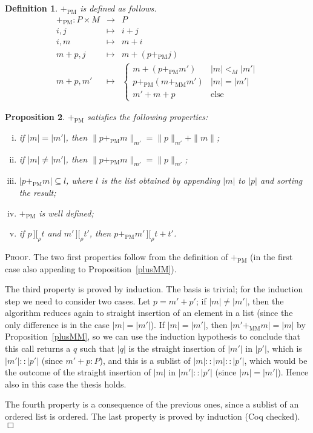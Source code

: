 \documentclass{article}
\newtheorem{definition}{Definition}[section]
\newtheorem{proposition}[definition]{Proposition}
\newenvironment{proof}{\smallskip\textsc{Proof.}}{\hspace*{\fill}$\Box$}
\newcommand{\intII}{\,]\![}
\newcommand{\intrel}{\mathbin{\intII_{\rho}}}
\newcommand{\coeff}[2]{\ensuremath{\|#2\|_{#1}}}
\newcommand{\plusMM}{\ensuremath{+_{\mathrm{MM}}}}
\newcommand{\plusPM}{\ensuremath{+_{\mathrm{PM}}}}
\begin{document}
\begin{definition}\label{defn:plusPM} {\plusPM} is defined as follows.
\begin{eqnarray*}
\plusPM : P\times M & \to & P \\
 i, j & \mapsto & i+j \\
 i, m & \mapsto & m+i \\
 m+p, j & \mapsto & m+(p\plusPM j) \\
 m+p, m' & \mapsto &
\left\{\begin{array}{ll} m+(p\plusPM m') & |m|<_M|m'| \\
 p\plusPM(m\plusMM m') & |m|=|m'| \\
 m'+m+p & \mbox{else}\end{array}\right.
\end{eqnarray*}
\end{definition}

\begin{proposition}\label{plusPM}
{\plusPM} satisfies the following properties:
\begin{enumerate}[(i)]
\item if $|m|=|m'|$, then $\coeff{m'}{p\plusPM m}=\coeff{m'}p+\|m\|$;
\item if $|m|\neq|m'|$, then $\coeff{m'}{p\plusPM m}=\coeff{m'}p$;
\item $|p\plusPM m|\subseteq l$, where $l$ is the list obtained by appending
$|m|$ to $|p|$ and sorting the result;
\item {\plusPM} is well defined;
\item if $p\intrel t$ and $m'\intrel t'$, then $p\plusPM m'\intrel t+t'$.
\end{enumerate}
\end{proposition}
\begin{proof}
The two first properties follow from the definition of {\plusPM} (in the
first case also appealing to Proposition~\ref{plusMM}).

The third property is proved by induction.  The basis is trivial; for
the induction step we need to consider two cases.  Let $p=m'+p'$; if
$|m|\neq|m'|$, then the algorithm reduces again to straight insertion
of an element in a list (since the only difference is in the case
$|m|=|m'|$).  If $|m|=|m'|$, then $|m'\plusMM m|=|m|$ by
Proposition~\ref{plusMM}, so we can use the induction hypothesis to
conclude that this call returns a $q$ such that $|q|$ is the straight
insertion of $|m'|$ in $|p'|$, which is $|m'|::|p'|$ (since $m'+p:P$),
and this is a sublist of $|m|::|m|::|p'|$, which would be the outcome of
the straight insertion of $|m|$ in $|m'|::|p'|$ (since $|m|=|m'|$).
Hence also in this case the thesis holds.

The fourth property is a consequence of the previous ones, since a sublist
of an ordered list is ordered.  The last property is proved by induction
(Coq checked).
\end{proof}
\end{document}
